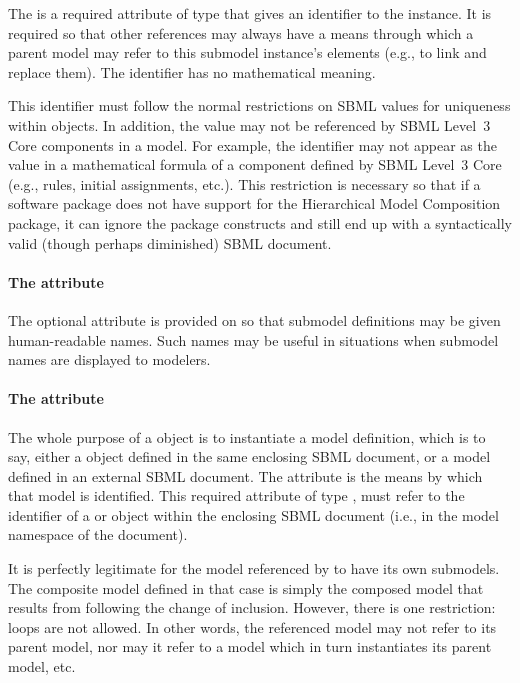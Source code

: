 The  is a required attribute of type  that gives
an identifier to the \Submodel instance.  It is required so that other
references may always have a means through which a parent model may
refer to this submodel instance's elements (e.g., to link and replace
them).  The identifier has no mathematical meaning.

This identifier must follow the normal restrictions on SBML
 values for uniqueness within \Model objects.  In
addition, the  value may not be referenced by SBML Level~3
Core components in a model.  For example, the identifier may not appear
as the  value in a mathematical formula of a component
defined by SBML Level~3 Core (e.g., rules, initial assignments, etc.).
This restriction is necessary so that if a software package does not
have support for the Hierarchical Model Composition package, it can
ignore the package constructs and still end up with a syntactically
valid (though perhaps diminished) SBML document.


\paragraph{The \fixttspace{} attribute}

The optional  attribute is provided on \Submodel so that
submodel definitions may be given human-readable names.  Such names may
be useful in situations when submodel names are displayed to modelers.


\paragraph{The \fixttspace{} attribute}
\label{submodel-modelref}
  
The whole purpose of a \Submodel object is to instantiate a model
definition, which is to say, either a \Model object defined in the same
enclosing SBML document, or a model defined in an external SBML
document.  The  attribute is the means by which that
model is identified.  This required attribute of type ,
must refer to the identifier of a \Model or \ExternalModelDefinition
object within the enclosing SBML document (i.e., in the model namespace
of the document).

It is perfectly legitimate for the model referenced by 
to have its own submodels.  The composite model defined in that case is
simply the composed model that results from following the change of
inclusion.  However, there is one restriction: loops are not allowed.
In other words, the referenced model may not refer to its parent model,
nor may it refer to a model which in turn instantiates its parent model,
etc.

